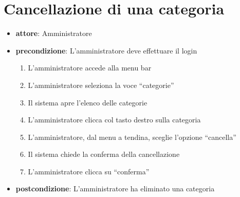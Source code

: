 \section{Cancellazione di una categoria}
\begin{itemize}
	\item \textbf{attore}: Amministratore
	\item \textbf{precondizione}: L’amministratore deve effettuare il login
	
	\begin{enumerate}
		\item L’amministratore accede alla menu bar
		\item L’amministratore seleziona la voce “categorie”
		\item Il sistema apre l’elenco delle categorie
		\item L’amministratore clicca col tasto destro sulla categoria
		\item L’amministratore, dal menu a tendina, sceglie l’opzione “cancella”
		\item Il sistema chiede la conferma della cancellazione
		\item L’amministratore clicca su “conferma”
	\end{enumerate}

	\item \textbf{postcondizione}: L’amministratore ha eliminato una categoria
\end{itemize}



